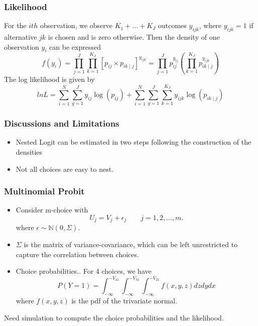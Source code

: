 \documentclass{beamer}
\newcommand{\1}{\mathbb{1}}
\newcommand{\N}{\mathbb{N}}
\begin{document}
\begin{frame}\frametitle{Likelihood}
For the $ith$ observation, we observe $K_1+\ldots+K_J$ outcomes $y_{ijk}$, where $y_{ijk}=1$ if alternative $jk$ is chosen and is zero otherwise. Then the density of one observation $y_i$ can be expressed
\begin{equation*}
 f(y_i) = \prod_{j=1}^{J} \prod_{k=1}^{K_J} [p_{ij} \times p_{ik \mid j}]^{y_{ijk}} = \prod_{j=1}^{J} p_{ij}^{y_{ij}}\left( \prod_{k=1}^{K_J} p_{ik \mid j}^{y_{ijk}} \right)
\end{equation*}
The log likelihood is given by
\begin{equation*}
 ln L = \sum_{i=1}^N \sum_{y=1}^J y_{ij}\log(p_{ij}) +
 \sum_{i=1}^N \sum_{y=1}^J \sum_{k=1}^{K_J} y_{ijk}\log(p_{ik \mid j})
\end{equation*}
\end{frame}

\begin{frame}\frametitle{Discussions and Limitations}
\begin{itemize}
 \item Nested Logit can be estimated in two steps following the construction of the densities
 \item Not all choices are easy to nest.
\end{itemize}
\end{frame}

\begin{frame}\frametitle{Multinomial Probit}
\begin{itemize}
 \item Consider m-choice with
\begin{equation}
 U_j = V_j + \epsilon_j \qquad j=1,2,\ldots,m.
\end{equation}
where $\epsilon \sim \N(0,\Sigma)$. 
\item $\Sigma$ is the matrix of variance-covariance, which can be left unrestricted to capture the correlation between 
choices. 
\item Choice probabilities.. For 4 choices, we have
\begin{equation}
 P(Y=1) = \int_{-\infty}^{-V_{41}} \int_{-\infty}^{-V_{31}}
 \int_{-\infty}^{-V_{21}} f(x,y,z)dzdydx
\end{equation}
where $f(x,y,z)$ is the pdf of the trivariate normal.
\end{itemize}
Need simulation to compute the choice probabilities and the likelihood. 
\end{frame}
\end{document}
